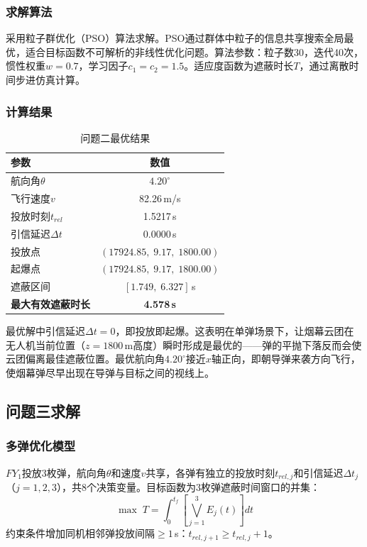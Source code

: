 \documentclass[12pt,a4paper]{article}
\begin{document}
\subsubsection{求解算法}

采用粒子群优化（PSO）算法求解。PSO通过群体中粒子的信息共享搜索全局最优，适合目标函数不可解析的非线性优化问题。算法参数：粒子数30，迭代40次，惯性权重$w=0.7$，学习因子$c_1=c_2=1.5$。适应度函数为遮蔽时长$T$，通过离散时间步进仿真计算。

\subsubsection{计算结果}

\begin{table}[H]
\centering
\caption{问题二最优结果}
\begin{tabular}{lc}
\toprule
参数 & 数值 \\
\midrule
航向角$\theta$ & $4.20^\circ$ \\
飞行速度$v$ & 82.26\,m/s \\
投放时刻$t_{rel}$ & 1.5217\,s \\
引信延迟$\Delta t$ & 0.0000\,s \\
投放点 & $(17924.85, \; 9.17, \; 1800.00)$ \\
起爆点 & $(17924.85, \; 9.17, \; 1800.00)$ \\
遮蔽区间 & $[1.749, \; 6.327]$\,s \\
\textbf{最大有效遮蔽时长} & \textbf{4.578\,s} \\
\bottomrule
\end{tabular}
\end{table}

最优解中引信延迟$\Delta t = 0$，即投放即起爆。这表明在单弹场景下，让烟幕云团在无人机当前位置（$z=1800$\,m高度）瞬时形成是最优的——弹的平抛下落反而会使云团偏离最佳遮蔽位置。最优航向角$4.20^\circ$接近$x$轴正向，即朝导弹来袭方向飞行，使烟幕弹尽早出现在导弹与目标之间的视线上。

\subsection{问题三求解}

\subsubsection{多弹优化模型}

$FY_1$投放3枚弹，航向角$\theta$和速度$v$共享，各弹有独立的投放时刻$t_{rel,j}$和引信延迟$\Delta t_j$（$j=1,2,3$），共8个决策变量。目标函数为3枚弹遮蔽时间窗口的并集：
\begin{equation}
\max \; T = \int_0^{t_f} \left[\bigvee_{j=1}^{3} E_j(t)\right] dt
\end{equation}
约束条件增加同机相邻弹投放间隔$\geq 1$\,s：$t_{rel,j+1} \geq t_{rel,j} + 1$。
\end{document}

